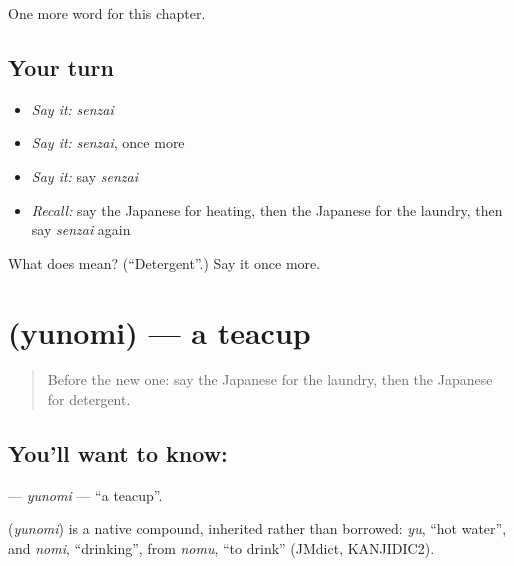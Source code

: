 \begin{grammarlens}[title={What you've built}]
One more word for this chapter.
\end{grammarlens}

\subsection*{Your turn}
\begin{itemize}
\raggedright
  \item \emph{Say it:} \emph{senzai}
  \item \emph{Say it:} \emph{senzai}, once more
  \item \emph{Say it:} say \emph{senzai}
  \item \emph{Recall:} say the Japanese for heating, then the Japanese for the laundry, then say \emph{senzai} again
\end{itemize}

\begin{tcolorbox}[breakable,colback=teal!4,colframe=teal!35!black,title={Before you move on}]
What does  mean? (\textquotedblleft{}Detergent\textquotedblright{}.) Say it once more.
\end{tcolorbox}
\section[\texorpdfstring{\ja{ゆのみ} (yunomi)}{ゆのみ (yunomi)}]{ (yunomi) — a teacup}

\label{lesson:JA-C102-yunomi}



\begin{quote}
Before the new one: say the Japanese for the laundry, then the Japanese for detergent.
\end{quote}

\subsection*{You'll want to know: }
\textbf{} — \emph{yunomi} — \textquotedblleft{}a teacup\textquotedblright{}.

\begin{cousinweb}
\textbf{} (\emph{yunomi}) is a native compound, inherited rather than borrowed: \emph{yu}, \textquotedblleft{}hot water\textquotedblright{}, and \emph{nomi}, \textquotedblleft{}drinking\textquotedblright{}, from \emph{nomu}, \textquotedblleft{}to drink\textquotedblright{} (JMdict, KANJIDIC2).
\end{cousinweb}


